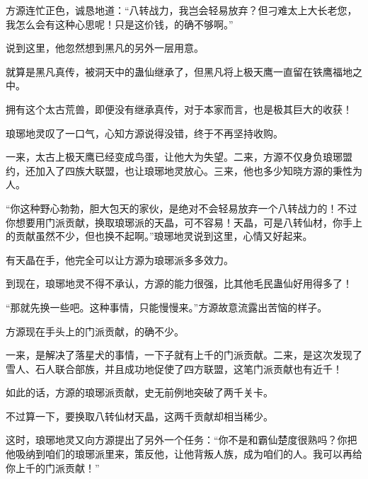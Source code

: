\begin{this_body}
方源连忙正色，诚恳地道：“八转战力，我岂会轻易放弃？但刁难太上大长老您，我怎么会有这种心思呢！只是这价钱，的确不够啊。”

说到这里，他忽然想到黑凡的另外一层用意。

就算是黑凡真传，被洞天中的蛊仙继承了，但黑凡将上极天鹰一直留在铁鹰福地之中。

拥有这个太古荒兽，即便没有继承真传，对于本家而言，也是极其巨大的收获！

琅琊地灵叹了一口气，心知方源说得没错，终于不再坚持收购。

一来，太古上极天鹰已经变成鸟蛋，让他大为失望。二来，方源不仅身负琅琊盟约，还加入了四族大联盟，也让琅琊地灵放心。三来，他也多少知晓方源的秉性为人。

“你这种野心勃勃，胆大包天的家伙，是绝对不会轻易放弃一个八转战力的！不过你想要用门派贡献，换取琅琊派的天晶，可不容易！天晶，可是八转仙材，你手上的贡献虽然不少，但也换不起啊。”琅琊地灵说到这里，心情又好起来。

有天晶在手，他完全可以让方源为琅琊派多多效力。

到现在，琅琊地灵不得不承认，方源的能力很强，比其他毛民蛊仙好用得多了！

“那就先换一些吧。这种事情，只能慢慢来。”方源故意流露出苦恼的样子。

方源现在手头上的门派贡献，的确不少。

一来，是解决了落星犬的事情，一下子就有上千的门派贡献。二来，是这次发现了雪人、石人联合部族，并且成功地促使了四方联盟，这笔门派贡献也有近千！

如此的话，方源的琅琊派贡献，史无前例地突破了两千关卡。

不过算一下，要换取八转仙材天晶，这两千贡献却相当稀少。

这时，琅琊地灵又向方源提出了另外一个任务：“你不是和霸仙楚度很熟吗？你把他吸纳到咱们的琅琊派里来，策反他，让他背叛人族，成为咱们的人。我可以再给你上千的门派贡献！”

\end{this_body}

